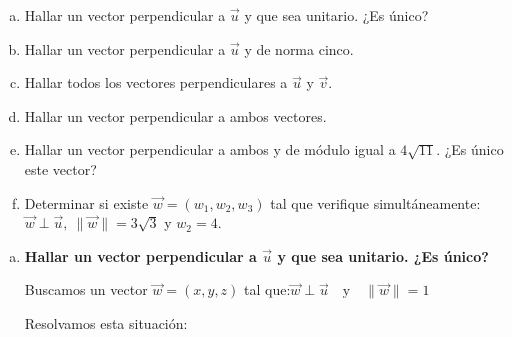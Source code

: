 \documentclass[11pt,a4paper]{article}
\newcommand{\jv}{\bm{\check{\jmath}}}
\newcommand{\kv}{\check{\bm k}}
\newcommand{\indicador}[4]{
{\tikz[remember picture,overlay]\coordinate (#1) at #2;}{\tikz[remember picture,overlay]\coordinate (#3) at #4;} 
}
\newcommand{\marka}[2]{
{\tikz[remember picture,overlay]\coordinate (#1) at #2;}
}
\begin{document}
\begin{enumerate}[\hspace{-5mm} 1) ]
\begin{enumerate}[a)]
    \item Hallar un vector perpendicular a $\vec{u}$ y que sea unitario. ¿Es único?

    \item Hallar un vector perpendicular a $\vec{u}$ y de norma cinco.

    \item Hallar todos los vectores perpendiculares a $\vec{u}$ y $\vec{v}$.

    \item Hallar un vector perpendicular a ambos vectores.

    \item Hallar un vector perpendicular a ambos y de módulo igual a $4\sqrt{11}$. ¿Es único este vector?

    \item Determinar si existe $\vec{w} = (w_1, w_2, w_3)$ tal que verifique simultáneamente: \  $\vec{w} \perp \vec{u}, \  \|\vec{w}\| = 3\sqrt{3}$  y   $w_2 = 4.$
\end{enumerate}



 

\begin{enumerate}[a)]
    \item \textbf{Hallar un vector perpendicular a $\vec{u}$ y que sea unitario. ¿Es único?}

Buscamos un vector $\vec{w} = (x, y, z)$ tal que:\quad $ \vec{w} \perp \vec{u}  \quad \text{y} \quad \|\vec{w}\| = 1$

\noindent Resolvamos esta situación:

\bigskip 


\end{enumerate}
\end{enumerate}
\end{document}
